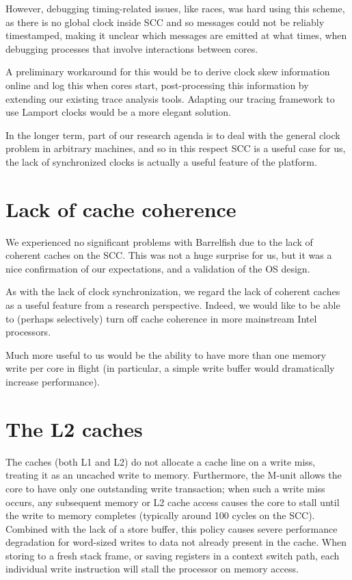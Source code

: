 \documentclass[a4paper,twoside]{report} %
\begin{document}
However, debugging timing-related issues, like races, was hard
using this scheme, as there is no global clock inside SCC and so
messages could not be reliably timestamped, making it unclear which
messages are emitted at what times, when debugging processes that
involve interactions between cores.  

A preliminary workaround for this would be to derive clock skew
information online and log this when cores start, post-processing this
information by extending our existing trace analysis tools.   Adapting
our tracing framework to use Lamport clocks would be a more elegant
solution. 

In the longer term, part of our research agenda is to deal with the 
general clock problem in arbitrary machines, and so in this respect
SCC is a useful case for us, the lack of synchronized clocks is
actually a useful feature of the platform.  

\section{Lack of cache coherence}

We experienced no significant problems with Barrelfish due to the lack
of coherent caches on the SCC.  This was not a huge surprise for us,
but it was a nice confirmation of our expectations, and a validation
of the OS design. 

As with the lack of clock synchronization, we regard the lack of
coherent caches as a useful feature from a research perspective.
Indeed, we would like to be able to (perhaps selectively) turn off
cache coherence in more mainstream Intel processors. 

Much more useful to us would be the ability to have more than one
memory write per core in flight (in particular, a simple write buffer
would dramatically increase performance). 

\section{The L2 caches}

The caches (both L1 and L2) do not allocate a cache line on a write miss,
treating it as an uncached write to memory. Furthermore, the M-unit allows the
core to have only one outstanding write transaction; when such a write miss
occurs, any subsequent memory or L2 cache access causes the core to stall
until the write to memory completes (typically around 100 cycles on the SCC).
Combined with the lack of a store buffer, this policy causes severe performance
degradation for word-sized writes to data not already present in the cache.
When storing to a fresh stack frame, or saving registers in a context switch
path, each individual write instruction will stall the processor on memory
access.
\end{document}
